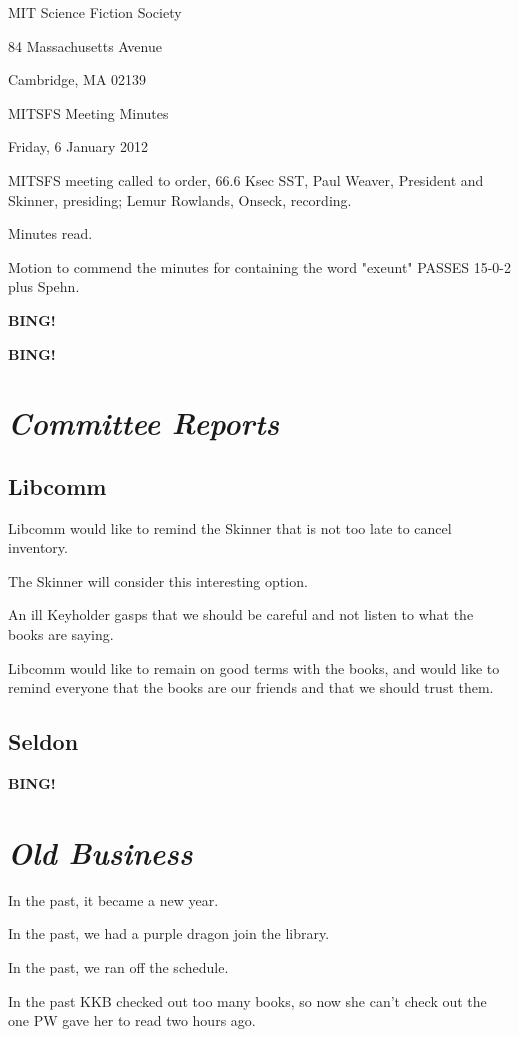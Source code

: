 \documentclass[10pt]{article}
\newcommand{\bing}{{\bf BING!} }
\newcommand{\goto}[1]{\bing \vskip 12pt \section*{{\em{#1}}}}
\newcommand{\ps}{ plus Spehn\xspace}
\newcommand{\skinner}{Paul Weaver, President and Skinner}
\newcommand{\onseck}{Lemur Rowlands, Onseck}
\newcommand{\meetingdate}{Friday, 6 January 2012}
\begin{document}
\begin{center}

MIT Science Fiction Society

84 Massachusetts Avenue

Cambridge, MA 02139

\vspace{12pt}

MITSFS Meeting Minutes

\meetingdate

\end{center}

\vspace{18pt}

\setlength{\parskip}{6pt}

\noindent
MITSFS meeting called to order, 66.6 Ksec SST,
\skinner, presiding; \onseck, recording.

Minutes read.

Motion to commend the minutes for containing the word "exeunt" PASSES 15-0-2\ps.

\bing

\goto{Committee Reports}

\subsection*{Libcomm}

Libcomm would like to remind the Skinner that is not too late to cancel inventory.

The Skinner will consider this interesting option.

An ill Keyholder gasps that we should be careful and not listen to what the books are saying.

Libcomm would like to remain on good terms with the books, and would like to remind
everyone that the books are our friends and that we should trust them.

\subsection*{Seldon}


\goto{Old Business}

In the past, it became a new year.

In the past, we had a purple dragon join the library.

In the past, we ran off the schedule.

In the past KKB checked out too many books, so now she can't check out the
one PW gave her to read two hours ago.
\end{document}
